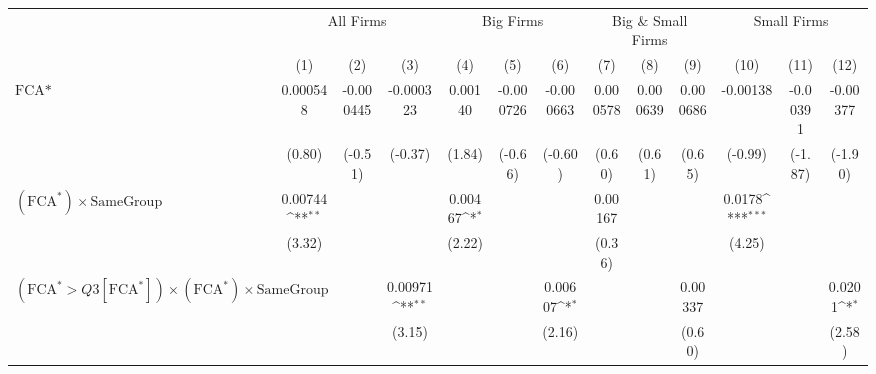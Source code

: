 {
\def\sym#1{\ifmmode^{#1}\else\(^{#1}\)\fi}
\begin{tabular}{l*{12}{c}}
\hline\hline
                &\multicolumn{3}{c}{All Firms}                           &\multicolumn{3}{c}{Big Firms}                           &\multicolumn{3}{c}{Big \& Small Firms}                  &\multicolumn{3}{c}{Small Firms}                         \\\cmidrule(lr){2-4}\cmidrule(lr){5-7}\cmidrule(lr){8-10}\cmidrule(lr){11-13}
                &\multicolumn{1}{c}{(1)}         &\multicolumn{1}{c}{(2)}         &\multicolumn{1}{c}{(3)}         &\multicolumn{1}{c}{(4)}         &\multicolumn{1}{c}{(5)}         &\multicolumn{1}{c}{(6)}         &\multicolumn{1}{c}{(7)}         &\multicolumn{1}{c}{(8)}         &\multicolumn{1}{c}{(9)}         &\multicolumn{1}{c}{(10)}         &\multicolumn{1}{c}{(11)}         &\multicolumn{1}{c}{(12)}         \\
\hline
$ \text{FCA*} $ & 0.000548         &-0.000445         &-0.000323         &  0.00140         &-0.000726         &-0.000663         & 0.000578         & 0.000639         & 0.000686         & -0.00138         & -0.00391         & -0.00377         \\
                &   (0.80)         &  (-0.51)         &  (-0.37)         &   (1.84)         &  (-0.66)         &  (-0.60)         &   (0.60)         &   (0.61)         &   (0.65)         &  (-0.99)         &  (-1.87)         &  (-1.90)         \\
[1em]
 $ (\text{FCA}^*) \times {\text{SameGroup} }  $ &  0.00744\sym{**} &                  &                  &  0.00467\sym{*}  &                  &                  &  0.00167         &                  &                  &   0.0178\sym{***}&                  &                  \\
                &   (3.32)         &                  &                  &   (2.22)         &                  &                  &   (0.36)         &                  &                  &   (4.25)         &                  &                  \\
[1em]
 $ (\text{FCA}^* > Q3[\text{FCA}^*]) \times  (\text{FCA}^*) \times {\text{SameGroup}}$&                  &                  &  0.00971\sym{**} &                  &                  &  0.00607\sym{*}  &                  &                  &  0.00337         &                  &                  &   0.0201\sym{*}  \\
                &                  &                  &   (3.15)         &                  &                  &   (2.16)         &                  &                  &   (0.60)         &                  &                  &   (2.58)         \\

\end{tabular}}
